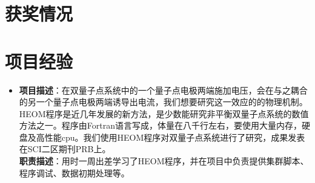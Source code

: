 \documentclass{resume}
\begin{document}
\section{获奖情况}

\section{项目经验}
\begin{itemize}%
\item  {}
\textbf{项目描述}：在双量子点系统中的一个量子点电极两端施加电压，会在与之耦合的另一个量子点电极两端诱导出电流，我们想要研究这一效应的的物理机制。HEOM程序是近几年发展的新方法，是少数能研究非平衡双量子点系统的数值方法之一。程序由Fortran语言写成，体量在八千行左右，要使用大量内存，硬盘及高性能cpu。我们使用HEOM程序对双量子点系统进行了研究，成果发表在SCI二区期刊PRB上。\\
\textbf{职责描述}：用时一周出差学习了HEOM程序，并在项目中负责提供集群脚本、程序调试、数据初期处理等。


\end{itemize}
\end{document}
